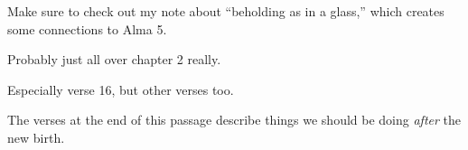 \begin{compactdesc}
				\item[{\hyperref[ROMANS-12-1]{Romans 12:1--2}}]
				\item[{\hyperref[ROMANS-6-3]{Romans 6:3--10}}] \phantom{.}
				\item[{\hyperref[2CORINTHIANS-3-6]{2 Corinthians 3:6}}]
				\item[{\hyperref[2CORINTHIANS-3-18]{2 Corinthians 3:18}}] \phantom{.}
					\begin{compactitem}
						\item Make sure to check out my note about ``beholding as in a glass,'' which creates some connections to Alma 5.
					\end{compactitem}
				\item[{\hyperref[2CORINTHIANS-4-10]{2 Corinthians 4:10--12}}]
				\item[{\hyperref[2CORINTHIANS-4-16]{2 Corinthians 4:16}}]
				\item[{\hyperref[2CORINTHIANS-5-17]{2 Corinthians 5:17--21}}]
				\item[{\hyperref[GALATIANS-4-1]{Galatians 4:1--7}}]
				\item[{\hyperref[GALATIANS-4-29]{Galatians 4:29}}]
				\item[{\hyperref[GALATIANS-6-15]{Galatians 6:15}}]
				\item[{\hyperref[EPHESIANS-2-1]{Ephesians 2:1--10}}]
				\item[{\hyperref[EPHESIANS-2-13]{Ephesians 2:13--22}}] \phantom{.}
					\begin{compactitem}
						\item Probably just all over chapter 2 really.
					\end{compactitem}
				\item[{\hyperref[EPHESIANS-3-14]{Ephesians 3:14--21}}] \phantom{.}
					\begin{compactitem}
						\item Especially verse 16, but other verses too.
					\end{compactitem} 
				\item[{\hyperref[EPHESIANS-4-17]{Ephesians 4:17--32}}] \phantom{.}
					\begin{compactitem}
						\item The verses at the end of this passage describe things we should be doing \textit{after} the new birth.
					\end{compactitem}
				\item[{\hyperref[PHILIPPIANS-3-20]{Philippians 3:20--21}}]
				\item[{\hyperref[COLOSSIANS-1-9]{Colossians 1:9--29}}]
			\end{compactdesc}
			

